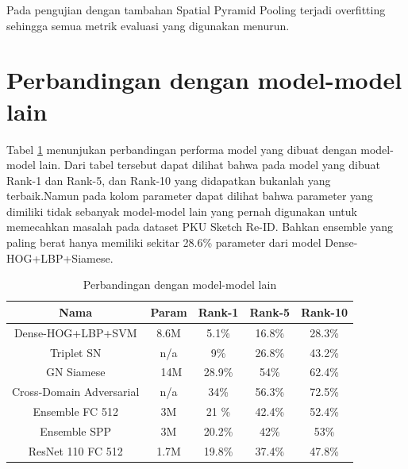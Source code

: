 Pada pengujian dengan tambahan Spatial Pyramid Pooling terjadi overfitting sehingga semua metrik evaluasi yang digunakan menurun. 

\section{Perbandingan dengan model-model lain}
\vspace{1ex}

Tabel \ref{tabel:comparison} menunjukan perbandingan performa model yang dibuat dengan model-model lain. Dari tabel tersebut dapat dilihat bahwa pada model yang dibuat Rank-1 dan Rank-5, dan Rank-10 yang didapatkan bukanlah yang terbaik.Namun pada kolom parameter dapat dilihat bahwa parameter yang dimiliki tidak sebanyak model-model lain yang pernah digunakan untuk memecahkan masalah pada dataset PKU Sketch Re-ID. Bahkan ensemble yang paling berat hanya memiliki sekitar 28.6\% parameter dari model Dense-HOG+LBP+Siamese.

\begin{longtable}{|c|c|c|c|c|}
	\caption{Perbandingan dengan model-model lain}
	\label{tabel:comparison}\\
	\hline
	\rowcolor[HTML]{C0C0C0}
			\textbf{Nama} & \textbf{Param} & \textbf{Rank-1} & \textbf{Rank-5} & \textbf{Rank-10} \\ \hline
Dense-HOG+LBP+SVM & 8.6M & 5.1\% & 16.8\% & 28.3\% \\ \hline
Triplet SN & n/a & 9\% & 26.8\% & 43.2\% \\ \hline
GN Siamese & ~14M & 28.9\% & 54\% & 62.4\%\\ \hline
Cross-Domain Adversarial & n/a & 34\% & 56.3\% & 72.5\%\\ \hline
Ensemble FC 512 & 3M & 21 \% & 42.4\% & 52.4\% \\ \hline
Ensemble SPP & 3M & 20.2\% & 42\% & 53\% \\ \hline
ResNet 110 FC 512 & 1.7M & 19.8\% & 37.4\% & 47.8\%\\ \hline
\end{longtable}


